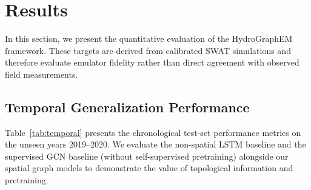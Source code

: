 \documentclass[preprint,12pt]{elsarticle}
\begin{document}
\section{Results}
In this section, we present the quantitative evaluation of the HydroGraphEM framework. These targets are derived from calibrated SWAT simulations and therefore evaluate emulator fidelity rather than direct agreement with observed field measurements.

\subsection{Temporal Generalization Performance}
Table~\ref{tab:temporal} presents the chronological test-set performance metrics on the unseen years 2019--2020. We evaluate the non-spatial LSTM baseline and the supervised GCN baseline (without self-supervised pretraining) alongside our spatial graph models to demonstrate the value of topological information and pretraining.
\end{document}
